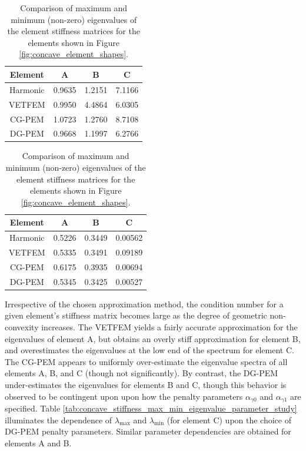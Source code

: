 \begin{table}
\centering
\begin{subtable}{.5\textwidth}
\centering
\begin{tabular}{| c || c | c | c |}
    \hline
		Element  & A      & B      & C \\ \hline \hline
		Harmonic	 & 0.9635 & 1.2151 & 7.1166 \\ \hline
		VETFEM	 & 0.9950 & 4.4864 & 6.0305 \\ \hline
		CG-PEM	 & 1.0723 & 1.2760 & 8.7108 \\ \hline
		DG-PEM	 & 0.9668 & 1.1997 & 6.2766 \\
    \hline
    \end{tabular}
    \caption{Largest eigenvalue: $\lambda_{\max}$}
    \label{tab:concave_stiffness_max_eigenvalue}
\end{subtable}%
\begin{subtable}{.5\textwidth}
\centering
\begin{tabular}{| c || c | c | c |}
    \hline
		Element  & A      & B      & C \\ \hline \hline
		Harmonic	 & 0.5226 & 0.3449 & 0.00562 \\ \hline
		VETFEM   & 0.5335 & 0.3491 & 0.09189 \\ \hline
		CG-PEM   & 0.6175 & 0.3935 & 0.00694 \\ \hline
		DG-PEM   & 0.5345 & 0.3425 & 0.00527 \\
    \hline
    \end{tabular}
    \caption{Smallest (non-zero) eigenvalue: $\lambda_{\min}$}
    \label{tab:concave_stiffness_min_eigenvalue}
\end{subtable}

\caption{Comparison of maximum and minimum (non-zero) eigenvalues of the element stiffness matrices for the elements shown in Figure \ref{fig:concave_element_shapes}.}
\label{tab:concave_stiffness_max_min_eigenvalue}
\end{table}

Irrespective of the chosen approximation method, the condition number for a given element's stiffness matrix becomes large as the degree of geometric non-convexity increases. The VETFEM yields a fairly accurate approximation for the eigenvalues of element A, but obtains an overly stiff approximation for element B, and overestimates the eigenvalues at the low end of the spectrum for element C. The CG-PEM appears to uniformly over-estimate the eigenvalue spectra of all elements A, B, and C (though not significantly). By contrast, the DG-PEM under-estimates the eigenvalues for elements B and C, though this behavior is observed to be contingent upon upon how the penalty parameters $\alpha_{\gamma0}$ and $\alpha_{\gamma1}$ are specified. Table \ref{tab:concave_stiffness_max_min_eigenvalue_parameter_study} illuminates the dependence of $\lambda_{\max}$ and $\lambda_{\min}$ (for element C) upon the choice of DG-PEM penalty parameters. Similar parameter dependencies are obtained for elements A and B.

